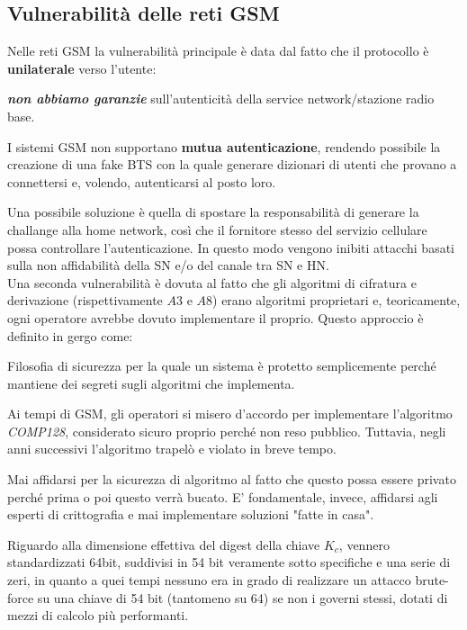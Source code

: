 \subsection{Vulnerabilità delle reti GSM}
Nelle reti GSM la vulnerabilità principale è data dal fatto che il protocollo è \textbf{unilaterale} verso l'utente:
\begin{note}
    \textbf{\textit{non abbiamo garanzie}}  sull'autenticità della service network/stazione radio base\footnotemark.
\end{note}
\begin{proposition}
I sistemi GSM non supportano \textbf{mutua autenticazione}, rendendo possibile la creazione di una fake BTS con la quale generare dizionari di utenti che provano a connettersi e, volendo, autenticarsi al posto loro.
\end{proposition}
Una possibile soluzione è quella di spostare la responsabilità di generare la challange alla home network, così che il fornitore stesso del servizio cellulare possa controllare l'autenticazione. In questo modo vengono inibiti attacchi basati sulla non affidabilità della SN e/o del canale tra SN e HN.\\
Una seconda vulnerabilità è dovuta al fatto che gli algoritmi di cifratura e derivazione (rispettivamente $A3$ e $A8$) erano algoritmi proprietari e, teoricamente, ogni operatore avrebbe dovuto implementare il proprio. Questo approccio è definito in gergo come:
\begin{definition}
\label{def:secbyobsc}
Filosofia di sicurezza per la quale un sistema è protetto semplicemente perché mantiene dei segreti sugli algoritmi che implementa.
\end{definition}
Ai tempi di GSM, gli operatori si misero d'accordo per implementare l'algoritmo \textit{COMP128}, considerato sicuro proprio perché non reso pubblico. Tuttavia, negli anni successivi l'algoritmo trapelò e violato in breve tempo.\\
\begin{remark}
Mai affidarsi per la sicurezza di algoritmo al fatto che questo possa essere privato perché prima o poi questo verrà bucato. E' fondamentale, invece, affidarsi agli esperti di crittografia e mai implementare soluzioni "fatte in casa".
\end{remark}
\begin{note}
Riguardo alla dimensione effettiva del digest della chiave $K_c$, vennero standardizzati 64bit, suddivisi in 54 bit veramente sotto specifiche e una serie di zeri, in quanto a quei tempi nessuno era in grado di realizzare un attacco brute-force su una chiave di 54 bit (tantomeno su 64) se non i governi stessi, dotati di mezzi di calcolo più performanti.
\end{note}\pagebreak
